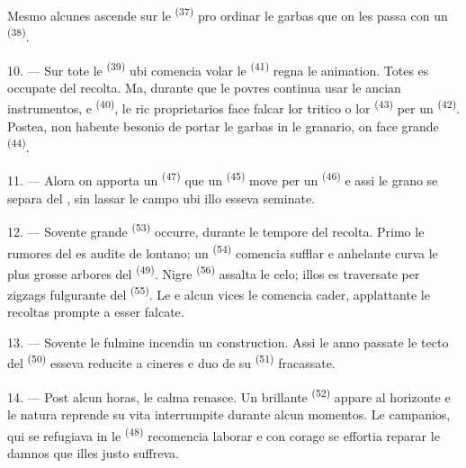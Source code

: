 Mesmo alcunes ascende sur le  \textsuperscript{(37)} pro
ordinar le garbas que on les passa con un 
\textsuperscript{(38)}.

10. --- Sur tote le  \textsuperscript{(39)} ubi comencia volar
le  \textsuperscript{(41)} regna le animation. Totes es occupate
del recolta. Ma, durante que le povres continua usar le ancian instrumentos,
 e  \textsuperscript{(40)}, le ric
proprietarios face falcar lor tritico o lor 
\textsuperscript{(43)} per un  \textsuperscript{(42)}.
Postea, non habente besonio de portar le garbas in le granario, on face grande
 \textsuperscript{(44)}.

11. --- Alora on apporta un  \textsuperscript{(47)} que
un  \textsuperscript{(45)} move per un  \textsuperscript{(46)} e assi le grano se separa del
, sin lassar le campo ubi illo esseva seminate.

\VUsaut{5.0mm}
\VUsaut{3.4mm}

12. --- Sovente grande  \textsuperscript{(53)} occurre,
durante le tempore del recolta. Primo le rumores del  es audite
de lontano; un  \textsuperscript{(54)} comencia
sufflar e anhelante curva le plus grosse arbores del 
\textsuperscript{(49)}. Nigre  \textsuperscript{(56)} assalta le
celo; illos es traversate per zigzags fulgurante del 
\textsuperscript{(55)}. Le  e alcun vices le 
comencia cader, applattante le recoltas prompte a esser falcate.

13. --- Sovente le fulmine incendia un construction. Assi le anno passate le
tecto del  \textsuperscript{(50)} esseva reducite a
cineres e duo de su  \textsuperscript{(51)} fracassate.

14. --- Post alcun horas, le calma renasce. Un brillante 
\textsuperscript{(52)} appare al horizonte e le natura reprende su vita
interrumpite durante alcun momentos. Le campanios, qui se refugiava in le
 \textsuperscript{(48)} recomencia laborar e con corage se
effortia reparar le damnos que illes justo suffreva.

